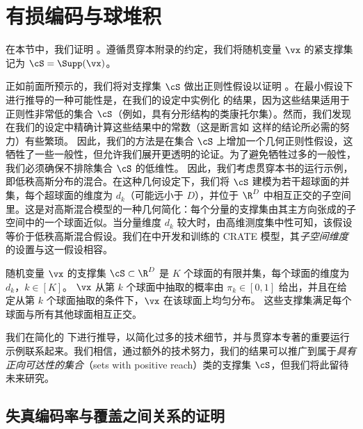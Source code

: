 \documentclass[../../book-main_zh.tex]{subfiles}
\begin{document}
\section{有损编码与球堆积}\label{app:rate-distortion-covering}

在本节中，我们证明 。遵循贯穿本附录的约定，我们将随机变量 $\vx$ 的紧支撑集记为 $\cS = \Supp(\vx)$。

正如前面所预示的，我们将对支撑集 $\cS$ 做出正则性假设以证明 。在最小假设下进行推导的一种可能性是，在我们的设定中实例化 \cite{Riegler2018-jh,Riegler2023-rr} 的结果，因为这些结果适用于正则性非常低的集合 $\cS$（例如，具有分形结构的类康托尔集）。然而，我们发现在我们的设定中精确计算这些结果中的常数（这是断言如  这样的结论所必需的努力）有些繁琐。
因此，我们的方法是在集合 $\cS$ 上增加一个几何正则性假设，这牺牲了一些一般性，但允许我们展开更透明的论证。为了避免牺牲过多的一般性，我们必须确保不排除集合 $\cS$ 的低维性。
因此，我们考虑贯穿本书的运行示例，即低秩高斯分布的混合。在这种几何设定下，我们将 $\cS$ 建模为若干超球面的并集，每个超球面的维度为 \(d_k\)（可能远小于 \(D\)），并位于 \(\R^D\) 中相互正交的子空间里。这是对高斯混合模型的一种几何简化：每个分量的支撑集由其主方向张成的子空间中的一个球面近似。当分量维度 \(d_k\) 较大时，由高维测度集中性可知，该假设等价于低秩高斯混合假设。我们在中开发和训练的 CRATE 模型，其\textit{子空间维度}的设置与这一假设相容。

\begin{assumption}\label{assumption:union-of-spheres}
    随机变量 $\vx$ 的支撑集 $\cS \subset \R^D$ 是 $K$ 个球面的有限并集，每个球面的维度为 $d_k$，$k \in [K]$。
    $\vx$ 从第 $k$ 个球面中抽取的概率由 $\pi_k \in [0, 1]$ 给出，并且在给定从第 $k$ 个球面抽取的条件下，$\vx$ 在该球面上均匀分布。
    这些支撑集满足每个球面与所有其他球面相互正交。
\end{assumption}

我们在简化的  下进行推导，以简化过多的技术细节，并与贯穿本专著的重要运行示例联系起来。我们相信，通过额外的技术努力，我们的结果可以推广到属于\textit{具有正向可达性的集合}（sets with positive reach）类的支撑集 $\cS$，但我们将此留待未来研究。

\subsection{失真编码率与覆盖之间关系的证明}
\end{document}
